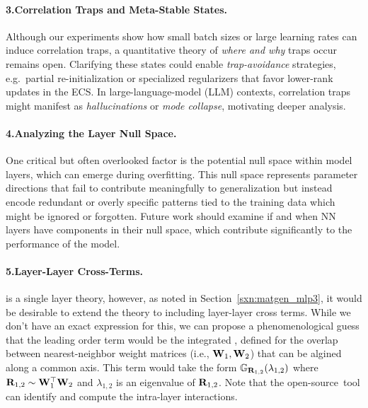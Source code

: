 \paragraph{3.\quad Correlation Traps and Meta-Stable States.}
Although our experiments show how small batch sizes or large learning rates can induce correlation traps, 
a quantitative theory of \emph{where and why} traps occur remains open. Clarifying these states could 
enable \emph{trap-avoidance} strategies, e.g.\ partial re-initialization or specialized regularizers that 
favor lower-rank updates in the ECS. In large-language-model (LLM) contexts, correlation traps might 
manifest as \emph{hallucinations} or \emph{mode collapse}, motivating deeper analysis.

\paragraph{4.\quad Analyzing the Layer Null Space.}
One critical but often overlooked factor is the potential null space within model layers, which can emerge during overfitting. This null space represents parameter directions that fail to contribute meaningfully to generalization but instead encode redundant or overly specific patterns tied to the training data which might be ignored or forgotten.
Future work should examine if and when NN layers have components in their null space,
which contribute significantly to the performance of the model.

\paragraph{5.\quad Layer-Layer Cross-Terms.}
\SETOL is a single layer theory, however, as noted in Section~\ref{sxn:matgen_mlp3}, it would 
be desirable to extend the theory to including layer-layer cross terms.
While we don't have an exact expression for this, we can propose a phenomenological guess
that the leading order term would be the integrated \RTransform,
defined for the overlap between nearest-neighbor weight matrices
(i.e., ${\mathbf{W}}_{1},{\mathbf{W}}_{2}$) that can be algined along a common axis.
This term would take the form $\mathbb{G}_{\mathbf{R}_{1,2}}(\lambda_{1,2})$
where $\mathbf{R}_{1,2}\sim{\mathbf{W}}_{1}^{\top}{\mathbf{W}}_{2}$ and $\lambda_{1,2}$ is an
eigenvalue of $\mathbf{R}_{1,2}$.  Note that the open-source~\WW tool can
identify and compute the intra-layer interactions.\cite{WW}



